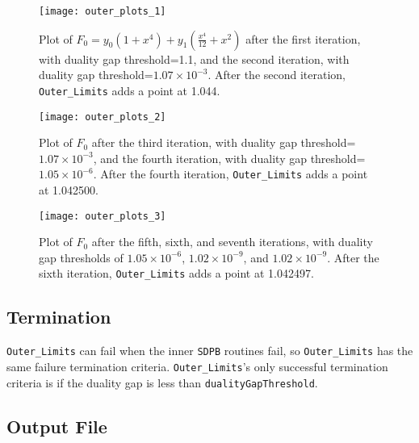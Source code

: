 \documentclass[12pt]{article}
\numberwithin{equation}{section}
\begin{document}
\pagebreak

\begin{figure}
\begin{center}
\texttt{[image: outer\_plots\_1]}
\end{center}
\caption{Plot of $F_{0}=y_{0}\left(1+x^4\right) + y_{1}\left(\frac{x^4}{12} + x^2\right)$
  after the first iteration, with duality gap threshold=1.1, and the second
  iteration, with duality gap threshold=$1.07\times10^{-3}$.  After the second
  iteration, \texttt{Outer\_Limits} adds a point at 1.044.}
\label{fig:plot1}
\end{figure}

\begin{figure}
\begin{center}
\texttt{[image: outer\_plots\_2]}
\end{center}
\caption{Plot of $F_{0}$
  after the third iteration, with duality gap threshold=$1.07\times10^{-3}$, and the fourth iteration, with duality gap threshold=$1.05\times10^{-6}$.  After the fourth
  iteration, \texttt{Outer\_Limits} adds a point at 1.042500.}
\label{fig:plot2}
\end{figure}

\begin{figure}
\begin{center}
\texttt{[image: outer\_plots\_3]}
\end{center}
\caption{Plot of $F_{0}$ after the fifth, sixth, and seventh
  iterations, with duality gap thresholds of $1.05\times10^{-6}$,
  $1.02\times10^{-9}$, and $1.02\times10^{-9}$.  After the sixth
  iteration, \texttt{Outer\_Limits} adds a point at 1.042497.}
\label{fig:plot3}
\end{figure}

\pagebreak

\subsection{Termination}

\texttt{Outer\_Limits} can fail when the inner \texttt{SDPB} routines
fail, so \texttt{Outer\_Limits} has the same failure termination
criteria.  \texttt{Outer\_Limits}'s only successful termination
criteria is if the duality gap is less than
\texttt{dualityGapThreshold}.

\pagebreak

\subsection{Output File}
\end{document}
